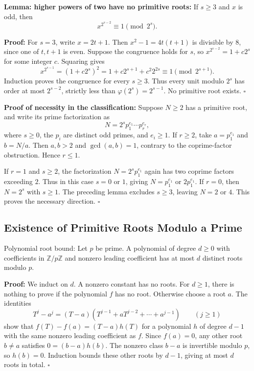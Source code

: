 \documentclass[a4paper,11pt,abstracton]{scrartcl}
\theoremstyle{dotlessP}
\theoremstyle{dotlessS}
\theoremstyle{remark}
\theoremstyle{definition}
\begin{document}
\begin{remark_box}
\textbf{Lemma: higher powers of two have no primitive roots:}
If $s\geq3$ and $x$ is odd, then
\[
    x^{2^{s-2}}\equiv1\pmod{2^s}.
\]
\end{remark_box}

\textbf{Proof:}
For $s=3$, write $x=2t+1$. Then
$x^2-1=4t(t+1)$ is divisible by $8$, since one of $t,t+1$ is even.
Suppose the congruence holds for $s$, so $x^{2^{s-2}}=1+c2^s$
for some integer $c$. Squaring gives
\[
    x^{2^{s-1}}=(1+c2^s)^2
       =1+c2^{s+1}+c^2 2^{2s}\equiv1\pmod{2^{s+1}}.
\]
Induction proves the congruence for every $s\geq3$.
Thus every unit modulo $2^s$ has order at most $2^{s-2}$, strictly
less than $\varphi(2^s)=2^{s-1}$. No primitive root exists.
\hfill$\square$


\textbf{Proof of necessity in the classification:}
Suppose $N\geq2$ has a primitive root, and write its prime factorization as
\[
    N=2^s p_1^{e_1}\cdots p_r^{e_r},
\]
where $s\geq0$, the $p_i$ are distinct odd primes, and $e_i\geq1$.
If $r\geq2$, take $a=p_1^{e_1}$ and $b=N/a$.
Then $a,b>2$ and $\gcd(a,b)=1$, contrary to the coprime-factor obstruction.
Hence $r\leq1$.

If $r=1$ and $s\geq2$, the factorization
$N=2^s p_1^{e_1}$ again has two coprime factors exceeding $2$.
Thus in this case $s=0$ or $1$, giving $N=p_1^{e_1}$ or $2p_1^{e_1}$.
If $r=0$, then $N=2^s$ with $s\geq1$. The preceding lemma excludes
$s\geq3$, leaving $N=2$ or $4$.
This proves the necessary direction.
\hfill$\square$


\subsection{Existence of Primitive Roots Modulo a Prime}

\begin{mainbox}{Polynomial root bound:}
Let $p$ be prime. A polynomial of degree $d\geq0$ with coefficients
in $\mathbb{Z}/p\mathbb{Z}$ and nonzero leading coefficient has at
most $d$ distinct roots modulo $p$.
\end{mainbox}

\textbf{Proof:}
We induct on $d$. A nonzero constant has no roots.
For $d\geq1$, there is nothing to prove if the polynomial $f$ has no root.
Otherwise choose a root $a$. The identities
\[
    T^j-a^j=(T-a)(T^{j-1}+aT^{j-2}+\cdots+a^{j-1})
    \qquad(j\geq1)
\]
show that $f(T)-f(a)=(T-a)h(T)$ for a polynomial $h$ of degree $d-1$
with the same nonzero leading coefficient as $f$.
Since $f(a)=0$, any other root $b\neq a$ satisfies
$0=(b-a)h(b)$. The nonzero class $b-a$ is invertible modulo $p$, so
$h(b)=0$. Induction bounds these other roots by $d-1$, giving at most
$d$ roots in total.
\hfill$\square$
\end{document}
